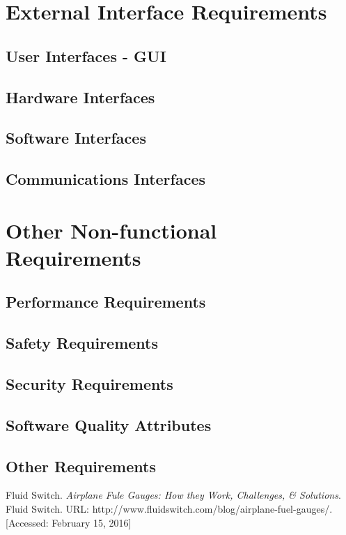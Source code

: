 \documentclass[10pt, a4paper, onecolumn]{scrartcl}
\begin{document}
	
	\section{External Interface Requirements}
	
		\subsection{User Interfaces - GUI}
		
		\subsection{Hardware Interfaces}
		
		\subsection{Software Interfaces}
		
		\subsection{Communications Interfaces}
	
	\section{Other Non-functional Requirements}
	
		\subsection{Performance Requirements}
		
		\subsection{Safety Requirements}
		
		\subsection{Security Requirements}
		
		\subsection{Software Quality Attributes}
		
		\subsection{Other Requirements}
	
	\begin{thebibliography}{99}
		Fluid Switch. \textit{Airplane Fule Gauges: How they Work, Challenges, \& Solutions}. Fluid Switch. URL: http://www.fluidswitch.com/blog/airplane-fuel-gauges/. [Accessed: February 15, 2016]
	\end{thebibliography}
	
	
	
	
	
\end{document}
